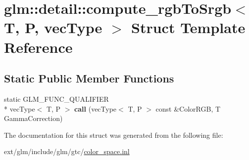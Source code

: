 \hypertarget{structglm_1_1detail_1_1compute__rgb_to_srgb}{\section{glm\-:\-:detail\-:\-:compute\-\_\-rgb\-To\-Srgb$<$ T, P, vec\-Type $>$ Struct Template Reference}
\label{structglm_1_1detail_1_1compute__rgb_to_srgb}
}
\subsection*{Static Public Member Functions}
\begin{DoxyCompactItemize}
\item 
\hypertarget{structglm_1_1detail_1_1compute__rgb_to_srgb_a641d15ac773c5b20ad9917ec0ea2974c}{static G\-L\-M\-\_\-\-F\-U\-N\-C\-\_\-\-Q\-U\-A\-L\-I\-F\-I\-E\-R \\*
vec\-Type$<$ T, P $>$ {\bfseries call} (vec\-Type$<$ T, P $>$ const \&Color\-R\-G\-B, T Gamma\-Correction)}\label{structglm_1_1detail_1_1compute__rgb_to_srgb_a641d15ac773c5b20ad9917ec0ea2974c}

\end{DoxyCompactItemize}


The documentation for this struct was generated from the following file\-:\begin{DoxyCompactItemize}
\item 
ext/glm/include/glm/gtc/\hyperlink{gtc_2color__space_8inl}{color\-\_\-space.\-inl}\end{DoxyCompactItemize}
